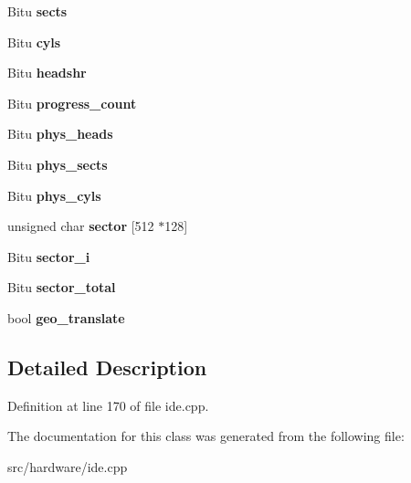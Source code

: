 \begin{DoxyCompactItemize}
\item 
\hypertarget{classIDEATADevice_a77463c48bf871a84d61a8b9bd1e95ffa}{Bitu {\bfseries sects}}\label{classIDEATADevice_a77463c48bf871a84d61a8b9bd1e95ffa}

\item 
\hypertarget{classIDEATADevice_a17435363559ff62f0d240f17f62c21cc}{Bitu {\bfseries cyls}}\label{classIDEATADevice_a17435363559ff62f0d240f17f62c21cc}

\item 
\hypertarget{classIDEATADevice_a907dbc2d9356cb6f98668573faf71242}{Bitu {\bfseries headshr}}\label{classIDEATADevice_a907dbc2d9356cb6f98668573faf71242}

\item 
\hypertarget{classIDEATADevice_a255e5d56bc9bf73d1cfdd542fd30126c}{Bitu {\bfseries progress\-\_\-count}}\label{classIDEATADevice_a255e5d56bc9bf73d1cfdd542fd30126c}

\item 
\hypertarget{classIDEATADevice_a917ccd0ef8076957499b62dd55a73377}{Bitu {\bfseries phys\-\_\-heads}}\label{classIDEATADevice_a917ccd0ef8076957499b62dd55a73377}

\item 
\hypertarget{classIDEATADevice_a15d352c5e1d3dcc12fc98b21c4ee3e40}{Bitu {\bfseries phys\-\_\-sects}}\label{classIDEATADevice_a15d352c5e1d3dcc12fc98b21c4ee3e40}

\item 
\hypertarget{classIDEATADevice_a99762c7f195dfffc524e3078b4a1e2bc}{Bitu {\bfseries phys\-\_\-cyls}}\label{classIDEATADevice_a99762c7f195dfffc524e3078b4a1e2bc}

\item 
\hypertarget{classIDEATADevice_aaf448a547054c85529e233d5381267d0}{unsigned char {\bfseries sector} \mbox{[}512 $\ast$128\mbox{]}}\label{classIDEATADevice_aaf448a547054c85529e233d5381267d0}

\item 
\hypertarget{classIDEATADevice_a28e1aaa1f0f87336ee5fe12212bdfdf1}{Bitu {\bfseries sector\-\_\-i}}\label{classIDEATADevice_a28e1aaa1f0f87336ee5fe12212bdfdf1}

\item 
\hypertarget{classIDEATADevice_a1eda9b2179b67dca4f5c850bff4a2c4c}{Bitu {\bfseries sector\-\_\-total}}\label{classIDEATADevice_a1eda9b2179b67dca4f5c850bff4a2c4c}

\item 
\hypertarget{classIDEATADevice_a85149993bb50733c34f92c123d6addec}{bool {\bfseries geo\-\_\-translate}}\label{classIDEATADevice_a85149993bb50733c34f92c123d6addec}

\end{DoxyCompactItemize}


\subsection{Detailed Description}


Definition at line 170 of file ide.\-cpp.



The documentation for this class was generated from the following file\-:\begin{DoxyCompactItemize}
\item 
src/hardware/ide.\-cpp\end{DoxyCompactItemize}

